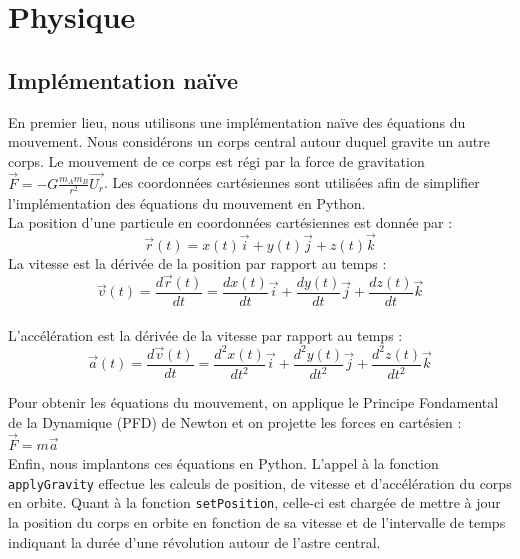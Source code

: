 \documentclass[a4paper, 12pt]{article}
\begin{document}
\section{Physique}
%
%
\subsection{Implémentation naïve}	
	En premier lieu, nous utilisons une implémentation naïve des équations du mouvement. Nous considérons un corps central autour duquel gravite un autre corps. Le mouvement de ce corps est régi par la force de gravitation $\vec{F} = -G\frac{m_A m_B}{r^2} \vec{U_r}$. Les coordonnées cartésiennes sont utilisées afin de simplifier l'implémentation des équations du mouvement en Python. \\

La position d'une particule en coordonnées cartésiennes est donnée par :
        \begin{equation}
            \vec{r}(t) = x(t) \vec{i} + y(t) \vec{j} + z(t) \vec{k} 
        \end{equation} 
La vitesse est la dérivée de la position par rapport au temps :
        \begin{equation}
            \vec{v}(t) = \frac{d\vec{r}(t)}{dt} = \frac{dx(t)}{dt} \vec{i} + \frac{dy(t)}{dt} \vec{j} + \frac{dz(t)}{dt} \vec{k}
        \end{equation} \\    
L'accélération est la dérivée de la vitesse par rapport au temps :
        \begin{equation}
            \vec{a}(t) = \frac{d\vec{v}(t)}{dt} = \frac{d^2x(t)}{dt^2} \vec{i} + \frac{d^2y(t)}{dt^2} \vec{j} + \frac{d^2z(t)}{dt^2} \vec{k}
        \end{equation}

Pour obtenir les équations du mouvement, on applique le Principe Fondamental de la Dynamique (PFD) de Newton et on projette les forces en cartésien : $\vec{F} = m \vec{a}$ \\

        
Enfin, nous implantons ces équations en Python. L'appel à la fonction \texttt{applyGravity} effectue les calculs de position, de vitesse et d'accélération du corps en orbite. Quant à la fonction \texttt{setPosition}, celle-ci est chargée de mettre à jour la position du corps en orbite en fonction de sa vitesse et de l'intervalle de temps indiquant la durée d'une révolution autour de l'astre central. 
\end{document}

